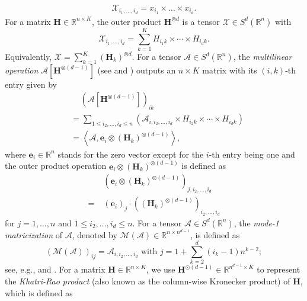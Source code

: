 \documentclass{article}
\theoremstyle{plain}
\theoremstyle{definition}
\theoremstyle{remark}
\newcommand{\Br}{\mathbb{R}}
\newcommand{\BH}{\bm{H}}
\newcommand{\MCal}{\mathcal{M}}
\newcommand{\XCal}{\mathcal{X}}
\newcommand{\ACal}{\mathcal{A}}
\begin{document}
\begin{align} \label{eq: defotimes}
	\XCal_{i_1,\dots,i_d} = x_{i_1}\times \dots \times  x_{i_d}.
\end{align}
For a matrix $\bm{H} \in \Br^{n \times K}$, the outer product $\bm{H}^{\otimes d}$ is a tensor $\XCal \in S^d(\Br^n)$ \citep[Eq. (3.4)]{kolda2009tensor} with 
\begin{equation}\label{eq: defotimesH}
	\XCal_{i_1,\dots,i_d} = \sum_{k=1}^K H_{i_1 k}\times \cdots \times H_{i_d k}.
\end{equation}
Equivalently, $\XCal = \sum_{k=1}^K (\BH_k)^{\otimes d}$.
For a tensor $\ACal \in S^d(\Br^n)$, the \emph{multilinear operation} $\ACal\left[\bm{H}^{\otimes (d-1)}\right]$ (see \citet[Eq. (2); Section 1.2]{huang2022power} and \citet{richard2014statistical}) outputs an $ n \times K$ matrix with its $(i,k)$-th entry given by
\begin{align} \label{eq: grad-tensor-def}
	& \quad \, \left( \ACal\left[{\bm{H}}^{\otimes (d-1)}\right] \right)_{ik} \nonumber\\
	& = \sum_{1 \leq i_2,\dots,i_d \leq n} \left(\ACal_{i,i_2,\dots,i_d} \times H_{i_2k} \times \cdots \times H_{i_dk} \right) \nonumber \\
	& = \left \langle \ACal, \bm{e}_i \otimes (\bm{H}_k)^{\otimes (d-1)} \right\rangle,
\end{align}
where $\bm{e}_i \in \Br^n$ stands for the zero vector except for the $i$-th entry being one and the outer product operation $\bm{e}_i \otimes (\bm{H}_k)^{\otimes (d-1)}$ is defined as
\begin{align}
	&\left(\bm{e}_i \otimes (\bm{H}_k)^{\otimes (d-1)} \right)_{j,i_2,\dots,i_d} \nonumber \\
    = \;&(\bm{e}_i)_j \cdot \left((\bm{H}_k)^{\otimes (d-1)} \right)_{i_2,\dots,i_d}
\end{align}
for $j=1,\dots,n$ and $1 \leq i_2,\dots,i_d \leq n$.
For a tensor $\ACal \in S^d(\mathbb{R}^n)$, the \emph{mode-1 matricization} of $\ACal$, denoted by $\mathcal{M}(\ACal) \in \Br^{n \times n^{d-1}}$, is defined as
\begin{equation}\label{eq: matricization}
	( \MCal(\ACal))_{ij} = \ACal_{i,i_2,\dots,i_d} \text{ with } j = 1 + \sum_{k=2}^d (i_k-1)n^{k-2};
\end{equation}
see, e.g., \citet[Section 2.4]{kolda2009tensor} and \citet[Section 2.1]{han2022exact}.
For a matrix $\bm{H} \in \Br^{n \times K}$, we use $\bm{H}^{\odot (d-1)} \in \Br^{n^{d-1} \times K}$ to represent the \emph{Khatri-Rao product} (also known as the column-wise Kronecker product) of $\BH$, which is defined as
\end{document}
